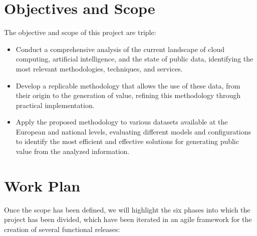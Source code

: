 \section{Objectives and Scope}

The objective and scope of this project are triple:
\begin{itemize}
	\item Conduct a comprehensive analysis of the current landscape of cloud computing, artificial intelligence, and the state of public data, identifying the most relevant methodologies, techniques, and services.
	
	\item Develop a replicable methodology that allows the use of these data, from their origin to the generation of value, refining this methodology through practical implementation.
	
	\item Apply the proposed methodology to various datasets available at the European and national levels, evaluating different models and configurations to identify the most efficient and effective solutions for generating public value from the analyzed information.
\end{itemize}

\section{Work Plan}

Once the scope has been defined, we will highlight the six phases into which the project has been divided, which have been iterated in an agile framework for the creation of several functional releases:

